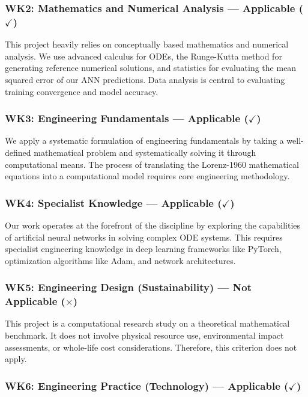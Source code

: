\subsubsection{WK2: Mathematics and Numerical Analysis --- Applicable ($\checkmark$)}

This project heavily relies on conceptually based mathematics and numerical analysis. We use advanced calculus for ODEs, the Runge-Kutta method for generating reference numerical solutions, and statistics for evaluating the mean squared error of our ANN predictions. Data analysis is central to evaluating training convergence and model accuracy.

\subsubsection{WK3: Engineering Fundamentals --- Applicable ($\checkmark$)}

We apply a systematic formulation of engineering fundamentals by taking a well-defined mathematical problem and systematically solving it through computational means. The process of translating the Lorenz-1960 mathematical equations into a computational model requires core engineering methodology.

\subsubsection{WK4: Specialist Knowledge --- Applicable ($\checkmark$)}

Our work operates at the forefront of the discipline by exploring the capabilities of artificial neural networks in solving complex ODE systems. This requires specialist engineering knowledge in deep learning frameworks like PyTorch, optimization algorithms like Adam, and network architectures.

\subsubsection{WK5: Engineering Design (Sustainability) --- Not Applicable ($\times$)}

This project is a computational research study on a theoretical mathematical benchmark. It does not involve physical resource use, environmental impact assessments, or whole-life cost considerations. Therefore, this criterion does not apply.

\subsubsection{WK6: Engineering Practice (Technology) --- Applicable ($\checkmark$)}

